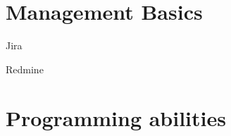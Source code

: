 \documentclass[9pt, a4paper, english]{extarticle}
\begin{document}
\pagebreak

\section* {Management Basics}
  \begin{multicols}{2}
    \begin {list}{\textbullet}{\itemsep=0mm}
      \item Jira
        \columnbreak
      \item Redmine
    \end{list}
  \end{multicols}


\section* {Programming abilities}
\end{document}

